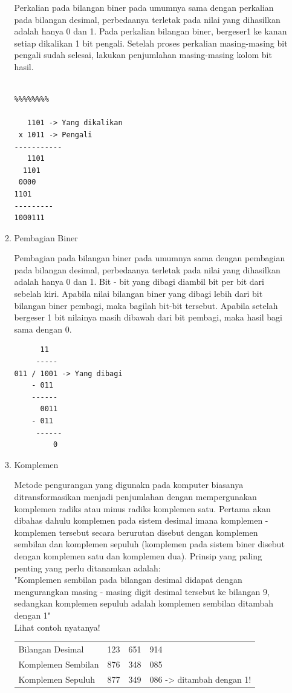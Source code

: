 \begin{enumerate}[label=(\alph*)]
\begin{enumerate}
\qquad Perkalian pada bilangan biner pada umumnya sama dengan perkalian pada bilangan desimal, perbedaanya terletak pada nilai yang dihasilkan adalah hanya 0 dan 1. Pada perkalian bilangan biner, bergeser1 ke kanan setiap dikalikan 1 bit pengali. Setelah proses perkalian masing-masing bit pengali sudah selesai, lakukan penjumlahan masing-masing kolom bit hasil.
\begin{verbatim}

%%%%%%%%

   1101 -> Yang dikalikan
 x 1011 -> Pengali
-----------
   1101
  1101
 0000
1101
---------
1000111
\end{verbatim}


\item Pembagian Biner

\qquad Pembagian pada bilangan biner pada umumnya sama dengan pembagian pada bilangan desimal, perbedaanya terletak pada nilai yang dihasilkan  adalah hanya 0 dan 1. Bit - bit yang dibagi diambil bit per bit dari sebelah kiri. Apabila nilai bilangan biner yang dibagi lebih dari bit bilangan biner pembagi, maka bagilah bit-bit tersebut. Apabila setelah bergeser 1 bit nilainya masih dibawah dari bit pembagi, maka hasil bagi sama dengan 0.
\begin{verbatim}
      11
     -----
011 / 1001 -> Yang dibagi
    - 011
    ------
      0011
    - 011
     ------
         0
\end{verbatim}


\item Komplemen

\qquad Metode pengurangan yang digunakn pada komputer biasanya ditransformasikan menjadi penjumlahan dengan mempergunakan komplemen radiks atau minus radiks komplemen satu. Pertama akan dibahas dahulu komplemen pada sistem desimal imana komplemen - komplemen tersebut secara berurutan disebut dengan komplemen sembilan dan komplemen sepuluh (komplemen pada sistem biner disebut dengan komplemen satu dan komplemen dua). Prinsip yang paling penting yang perlu ditanamkan adalah: \\

\qquad "Komplemen sembilan pada bilangan desimal didapat dengan mengurangkan masing - masing digit desimal tersebut ke bilangan 9, sedangkan komplemen sepuluh adalah komplemen sembilan ditambah dengan 1" \\
Lihat contoh nyatanya!\\

\begin{tabular}{ l l l l }
Bilangan Desimal & 123 & 651 & 914 \\
Komplemen Sembilan &876 &348 &085 \\ 
Komplemen Sepuluh &877 &349 &086 -> ditambah dengan 1! \\
\end{tabular}\\


\end{enumerate}
\end{enumerate}
